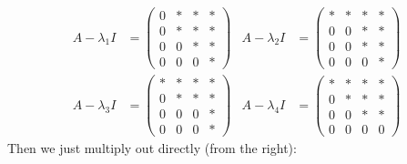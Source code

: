 \documentclass[a4paper]{article}
\begin{document}
\begin{align*}
  A - \lambda_1 I &=
  \begin{pmatrix}
    0 & * & * & *\\
    0 & * & * & *\\
    0 & 0 & * & *\\
    0 & 0 & 0 & *
  \end{pmatrix}&
  A - \lambda_2 I &=
  \begin{pmatrix}
    * & * & * & *\\
    0 & 0 & * & *\\
    0 & 0 & * & *\\
    0 & 0 & 0 & *
  \end{pmatrix}\\
  A - \lambda_3 I &=
  \begin{pmatrix}
    * & * & * & *\\
    0 & * & * & *\\
    0 & 0 & 0 & *\\
    0 & 0 & 0 & *
  \end{pmatrix}&
  A - \lambda_4 I &=
  \begin{pmatrix}
    * & * & * & *\\
    0 & * & * & *\\
    0 & 0 & * & *\\
    0 & 0 & 0 & 0
  \end{pmatrix}
\end{align*}
Then we just multiply out directly (from the right):
\end{document}
